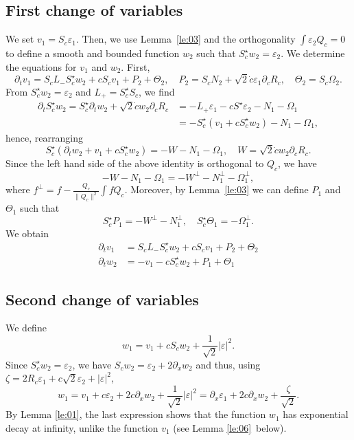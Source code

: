 \documentclass[11pt]{amsart}
\theoremstyle{remark}
\newcommand\ep{\varepsilon}
\begin{document}
\subsection{First change of variables}\label{S:3.2}
We set $v_1=S_c \ep_1$. Then, we use Lemma~\ref{le:03} and the orthogonality $\int \ep_2 Q_c=0$ to 
define a smooth and bounded function $w_2$ such that
$S_c^\star w_2 = \ep_2$.
We determine the equations for $v_1$ and $w_2$. First,
\[
\partial_t v_1=S_c L_- S_c^\star w_2+cS_c v_1+ P_2+\Theta_2,
\quad
P_2=S_c N_2+\sqrt{2} \dot c \ep_1 \partial_c R_c,
\quad \Theta_2 = S_c \Omega_2.
\]
From $S_c^\star w_2=\ep_2$ and $L_+=S_c^\star S_c$, we find
\begin{align*}
\partial_t S_c^\star w_2= S^\star_c \partial_t w_2+ \sqrt{2}\dot c w_2\partial_cR_c
&=-L_+\ep_1-cS^\star\ep_2-N_1-\Omega_1\\
&=-S_c^\star (v_1+c S_c^\star w_2)-N_1-\Omega_1,
\end{align*}
hence, rearranging
\[
S_c^\star\left(\partial_t w_2+v_1+c S_c^\star w_2\right)=-W -N_1-\Omega_1,
\quad W=\sqrt{2} \dot c w_2 \partial_c R_c.
\]
Since the left hand side of the above identity is orthogonal to $Q_c$, 
we have
\[
-W-N_1-\Omega_1
=-W^\perp-N_1^\perp-\Omega_1^\perp,
\]
where $f^\perp=f-\frac{Q_c}{\|Q_c\|^2}\int f Q_c $.
Moreover, by Lemma~\ref{le:03} we can define 
$P_1$ and $\Theta_1$ such that
\[
S_c^\star P_1=-W^\perp-N_1^\perp,\quad 
S_c^\star \Theta_1 = -\Omega_1^\perp.
\]
We obtain
\begin{align*}
\partial_t v_1&=S_c L_- S_c^\star w_2+cS_c v_1+ P_2+\Theta_2\\
\partial_t w_2&=-v_1-c S_c^\star w_2+P_1+\Theta_1
\end{align*}

\subsection{Second change of variables}
We define
\[
w_1=v_1+c S_c w_2+\frac{1}{\sqrt{2}} |\ep|^2.
\]
Since $S_c^\star w_2 = \ep_2$, we have
$S_c w_2 = \ep_2+ 2\partial_x w_2$
and thus, using $\zeta=2R_c\ep_1+c\sqrt{2}\ep_2+|\ep|^2$,
\[
w_1=v_1+c\ep_2+2c\partial_x w_2+\frac{1}{\sqrt{2}} |\ep|^2
=\partial_x \ep_1+2c\partial_x w_2+\frac{\zeta}{\sqrt{2}}.
\]
By Lemma \ref{le:01}, the last expression shows that the function $w_1$ has exponential decay at infinity, unlike the function $v_1$ (see Lemma \ref{le:06} below).
\end{document}
